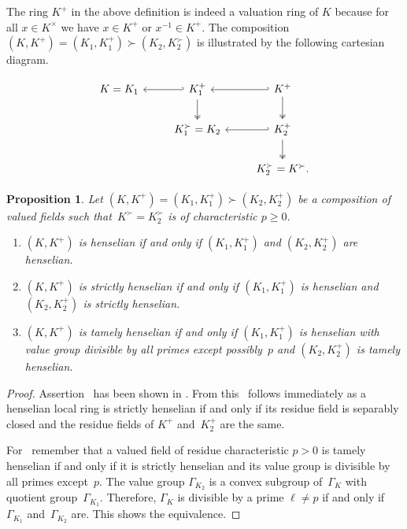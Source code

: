 \documentclass[a4paper,twoside,11pt,reqno]{amsart}
\newtheorem{prop}[thm]{Proposition}
\theoremstyle{definition}
\numberwithin{equation}{subsection}
\begin{document}
The ring $K^+$ in the above definition is indeed a valuation ring of $K$ because for all $x \in K^\times$ we have $x \in K^+$ or $x^{-1} \in K^+$.
The composition $(K,K^+) = (K_1,K_1^+) \succ (K_2,K_2^\succ)$ is illustrated by the following cartesian diagram.

\[
     \begin{tikzcd}
         K = K_1 & K_1^+ \ar[d,twoheadrightarrow] \ar[l,hook']  & K^+ \ar[d,twoheadrightarrow] \ar[l,hook'] \\
         & K_1^\succ = K_2 & K_2^+ \ar[l,hook'] \ar[d,twoheadrightarrow] \\
         & & K_2^\succ = K^\succ.
     \end{tikzcd}
\]

\begin{prop} \label{henselisation-composition}
    Let $(K,K^+) = (K_1,K_1^+) \succ (K_2,K_2^+)$ be a composition of valued fields such that~$K^\succ = K_2^\succ$ is of characteristic $p \ge 0$.
    \begin{enumerate}[ref=(\arabic*)]
        \item \label{lemitem:hens-comp1}
        $(K,K^+)$ is henselian if and only if $(K_1,K_1^+)$ and $(K_2,K_2^+)$ are henselian.
        \item \label{lemitem:hens-comp2}
        $(K,K^+)$ is strictly henselian if and only if $(K_1,K_1^+)$ is henselian and $(K_2,K_2^+)$ is strictly henselian.
        
        \item \label{lemitem:hens-comp3}
        $(K,K^+)$ is tamely henselian 
        if and only if $(K_1,K_1^+)$ is henselian with value group divisible by all primes except possibly~$p$ and $(K_2,K_2^+)$ is tamely henselian.
    \end{enumerate}
\end{prop}

\begin{proof}
    Assertion~ has been shown in \cite[Chapter~F, Propositions~9 and 10]{Ribenboim:Theorie-valuations}. 
    From this~ follows immediately as a henselian local ring is strictly henselian if and only if its residue field is separably closed and the residue fields of $K^+$ and~$K_2^+$ are the same.
    
    For~ remember that a valued field of residue characteristic $p > 0$ is tamely henselian if and only if it is strictly henselian and its value group is divisible by all primes except~$p$.
    The value group $\Gamma_{K_2}$ is a convex subgroup of~$\Gamma_K$ with quotient group~$\Gamma_{K_1}$.
    Therefore, $\Gamma_K$ is divisible by a prime $\ell \ne p$ if and only if $\Gamma_{K_1}$ and~$\Gamma_{K_2}$ are.
    This shows the equivalence.
\end{proof}
\end{document}
